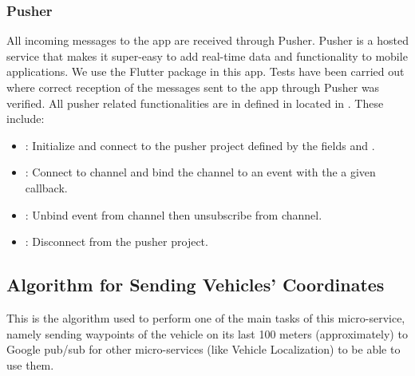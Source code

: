 \documentclass[letterpaper,10pt,english]{sphinxmanual}
\begin{document}
\subsubsection{Pusher}
\label{\detokenize{microservices/driver_app/services:pusher}}
All incoming messages to the app are received through Pusher.
Pusher is a hosted service that makes it super-easy to add real-time data and functionality to mobile applications.
We use the Flutter package  in this app.
Tests have been carried out where correct reception of the messages sent to the app through Pusher was verified.
All pusher related functionalities are in defined in  located in .
These include:
\begin{itemize}
\item {} 
: Initialize and connect to the pusher project defined by the fields  and .

\item {} 
: Connect to channel and bind the channel to an event with the a given callback.

\item {} 
: Unbind event from channel then unsubscribe from channel.

\item {} 
: Disconnect from the pusher project.

\end{itemize}


\subsection{Algorithm for Sending Vehicles’ Coordinates}
\label{\detokenize{microservices/driver_app/algorithm:algorithm-for-sending-vehicles-coordinates}}\label{\detokenize{microservices/driver_app/algorithm::doc}}
This is the algorithm used to perform one of the main tasks of this micro-service, namely sending waypoints of the vehicle on its last 100 meters (approximately) to Google pub/sub for other micro-services (like Vehicle Localization) to be able to use them.
\end{document}
